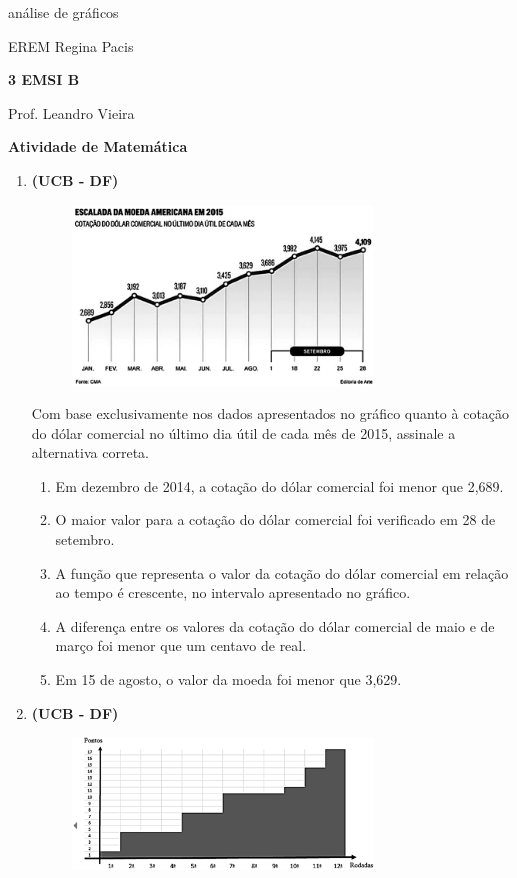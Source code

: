 \documentclass[twocolumn,oneside,a4paper,10pt]{article}
\newcommand{\EREM}{EREM Regina Pacis}
\newcommand{\curso}{\textbf{3 EMSI B}}
\newcommand{\professor}{Prof. Leandro Vieira}
\begin{document}
\pagestyle{empty}
análise de gráficos

\begin{center}
\EREM
\par %
\curso
\par
\professor
\par
\LARGE \textbf{Atividade de Matemática}
\end{center}

\begin{enumerate}

\item \textbf{(UCB - DF)}

\begin{figure}[!htb]
\center
\includegraphics[width=8cm]{Figuras/g1.png}
\end{figure}

Com base exclusivamente nos dados apresentados no gráfico quanto à cotação do dólar comercial no último dia útil de cada mês de 2015, assinale a alternativa correta.

\begin{enumerate}
\item Em dezembro de 2014, a cotação do dólar comercial foi menor que 2,689.
\item O maior valor para a cotação do dólar comercial foi verificado em 28 de setembro.
\item A função que representa o valor da cotação do dólar comercial em relação ao tempo é crescente, no intervalo apresentado no gráfico.
\item A diferença entre os valores da cotação do dólar comercial de maio e de março foi menor que um centavo de real.
\item Em 15 de agosto, o valor da moeda foi menor que 3,629.
\end{enumerate}


\item \textbf{(UCB - DF)}

\begin{figure}[!htb]
\center
\includegraphics[width=8cm]{Figuras/g2.png}
\end{figure}


\end{enumerate}
\end{document}
